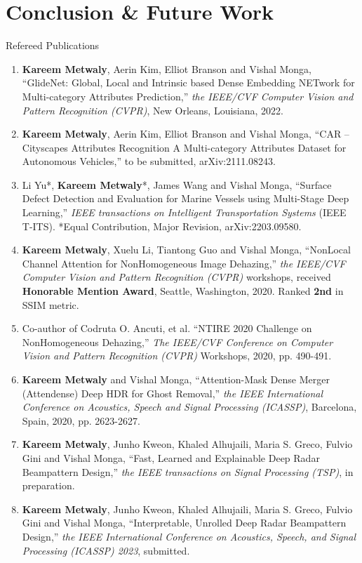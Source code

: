 \documentclass{bredelebeamerKareem}
\begin{document}
\section[Conclusion]{Conclusion \& Future Work}



\begin{frame}{Refereed Publications}\footnotesize
\begin{enumerate}
\item {\bf Kareem Metwaly}, Aerin Kim, Elliot Branson and Vishal Monga, “GlideNet: Global, Local and Intrinsic based Dense Embedding NETwork for Multi-category Attributes Prediction,” {\em the IEEE/CVF Computer Vision and Pattern Recognition (CVPR)}, New Orleans, Louisiana, 2022.

\item {\bf Kareem Metwaly}, Aerin Kim, Elliot Branson and Vishal Monga, “CAR – Cityscapes Attributes Recognition A Multi-category Attributes Dataset for Autonomous Vehicles,” to be submitted, arXiv:2111.08243.

\item Li Yu*, {\bf Kareem Metwaly}*, James Wang and Vishal Monga, “Surface Defect Detection and Evaluation for Marine Vessels using Multi-Stage Deep Learning,” {\em IEEE transactions on Intelligent Transportation Systems} (IEEE T-ITS). *Equal Contribution, Major Revision, arXiv:2203.09580.

\item {\bf Kareem Metwaly}, Xuelu Li, Tiantong Guo and Vishal Monga, ``NonLocal Channel Attention for NonHomogeneous Image Dehazing,'' {\em the IEEE/CVF Computer Vision and Pattern Recognition (CVPR)} workshops, received {\bf Honorable Mention Award}, Seattle, Washington, 2020. Ranked {\bf 2nd} in SSIM metric.

\item Co-author of Codruta O. Ancuti, et al. ``NTIRE 2020 Challenge on NonHomogeneous Dehazing,'' {\em The IEEE/CVF Conference on Computer Vision and Pattern Recognition (CVPR)} Workshops, 2020, pp. 490-491.

\item {\bf Kareem Metwaly} and Vishal Monga, ``Attention-Mask Dense Merger (Attendense) Deep HDR for Ghost Removal,'' {\em the IEEE International Conference on Acoustics, Speech and Signal Processing (ICASSP)}, Barcelona, Spain, 2020, pp. 2623-2627.

\item {\bf Kareem Metwaly}, Junho Kweon, Khaled Alhujaili, Maria S. Greco, Fulvio Gini and Vishal Monga, ``Fast, Learned and Explainable Deep Radar Beampattern Design,'' {\em the IEEE transactions on Signal Processing (TSP)}, in preparation.

\item {\bf Kareem Metwaly}, Junho Kweon, Khaled Alhujaili, Maria S. Greco, Fulvio Gini and Vishal Monga, ``Interpretable, Unrolled Deep Radar Beampattern Design,'' {\em the IEEE International Conference on Acoustics, Speech, and Signal Processing (ICASSP) 2023}, submitted.
\end{enumerate}
\end{frame}
\end{document}
